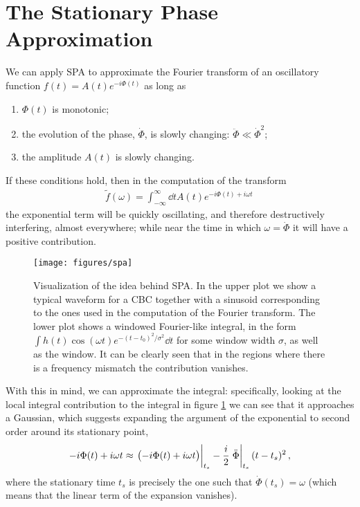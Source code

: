 \documentclass[main.tex]{subfiles}
\begin{document}
\appendix
\section{The Stationary Phase Approximation} \label{sec:spa}

We can apply \ac{SPA} to approximate the Fourier transform of an oscillatory function \(f(t) = A(t) e^{-i \Phi (t)}\) as long as 
\begin{enumerate}
    \item \(\Phi (t)\) is monotonic;
    \item the evolution of the phase, \(\dot{\Phi}\), is slowly changing: \(\ddot{\Phi} \ll \dot{\Phi}^2\);
    \item the amplitude \(A(t)\) is slowly changing.
\end{enumerate}


If these conditions hold, then in the computation of the transform 
%
\begin{align}
\widetilde{f}(\omega ) = \int_{- \infty }^{\infty } \dd{t} A(t) e^{- i \Phi (t) + i \omega t}
\,
\end{align}
%
the exponential term will be quickly oscillating, and therefore destructively interfering, almost everywhere; while near the time in which  \(\omega = \dot{\Phi}\) it will have a positive contribution. 

\begin{figure}[ht]
\centering
\texttt{[image: figures/spa]}
\caption{Visualization of the idea behind \ac{SPA}. In the upper plot we show a typical waveform for a \ac{CBC} together with a sinusoid corresponding to the ones used in the computation of the Fourier transform. The lower plot shows a windowed Fourier-like integral, in the form \(\int h(t) \cos(\omega t) e^{-(t-t_0 )^2 / \sigma^2} \dd{t}\) for some window width \(\sigma \), as well as the window. It can be clearly seen that in the regions where there is a frequency mismatch the contribution vanishes.}
\label{fig:spa}
\end{figure}

With this in mind, we can approximate the integral: specifically, looking at the local integral contribution to the integral in figure \ref{fig:spa} we can see that it approaches a Gaussian, which suggests expanding the argument of the exponential to second order around its stationary point, 
%
\begin{align}
- i \Phi (t) + i \omega t \approx \eval{\qty(-i \Phi (t) + i \omega t)}_{t_s} - \frac{i}{2} \eval{\ddot{\Phi}}_{t_s} (t-t_s)^2
\,,
\end{align}
%
where the stationary time \(t_s\) is precisely the one such that \(\dot{\Phi} (t_s) = \omega \) (which means that the linear term of the expansion vanishes). 
\end{document}

